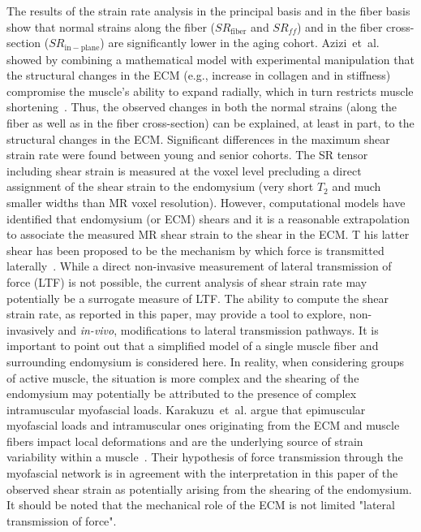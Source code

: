 The results of the strain rate analysis in the principal basis and in the fiber basis show that normal strains along the fiber ($SR_{\mathrm{fiber}}$ and $SR_{ff}$) and in the fiber cross-section ($SR_{\mathrm{in-plane}}$) are significantly lower in the aging cohort. 
Azizi~et~al. showed by combining a mathematical model with experimental manipulation that the structural changes in the ECM (e.g., increase in collagen and in stiffness) compromise the muscle's ability to expand radially, which in turn restricts muscle shortening~\cite{RNSS15}. 
Thus, the observed changes in both the normal strains (along the fiber as well as in the fiber cross-section) can be explained, at least in part, to the structural changes in the ECM.  
Significant differences in the maximum shear strain rate were found between young and senior cohorts. 
The SR tensor including shear strain is measured at the voxel level precluding a direct assignment of the shear strain to the endomysium (very short $T_2$ and much smaller widths than MR voxel resolution).  
However, computational models have identified that endomysium (or ECM) shears and it is a reasonable extrapolation to associate the measured MR shear strain to the shear in the ECM.  T
his latter shear has been proposed to be the mechanism by which force is transmitted laterally~\cite{RNS15, RNSS17}. 
While a direct non-invasive measurement of lateral transmission of force (LTF) is not possible, the current analysis of shear strain rate may potentially be a surrogate measure of LTF. 
The ability to compute the shear strain rate, as reported in this paper, may provide a tool to explore, non-invasively and \textit{in-vivo}, modifications to lateral transmission pathways.
It is important to point out that a simplified model of a single muscle fiber and surrounding endomysium is considered here. 
In reality, when considering groups of active muscle, the situation is more complex and the shearing of the endomysium may potentially be attributed to the presence of complex intramuscular myofascial loads.  
Karakuzu~et~al. argue that epimuscular myofascial loads and intramuscular ones originating from the ECM and muscle fibers impact local deformations and are the underlying source of strain variability within a muscle~\cite{RNSS4}.
Their hypothesis of force transmission through the myofascial network is in agreement with the interpretation in this paper of the observed shear strain as potentially arising from the shearing of the endomysium.
It should be noted that the mechanical role of the ECM is not limited "lateral transmission of force".
